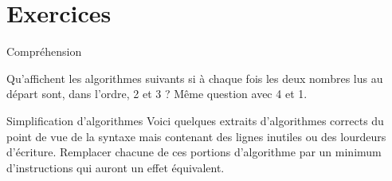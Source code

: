\section{Exercices}

\begin{Exercice}{Compréhension}

Qu’affichent les algorithmes suivants si à chaque fois les deux nombres
lus au départ sont, dans l'ordre, 2 et 3 ? Même question avec 4 et 1.



\end{Exercice}

\begin{Exercice}{Simplification d'algorithmes}
Voici quelques extraits d’algorithmes corrects du point de vue de la
syntaxe mais contenant des lignes inutiles ou des lourdeurs d’écriture.
Remplacer chacune de ces portions d’algorithme par un minimum
d’instructions qui auront un effet équivalent.





\end{Exercice}

